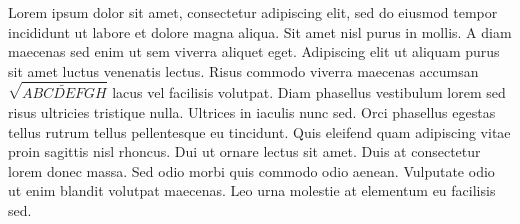 Lorem ipsum dolor sit amet, consectetur adipiscing elit, sed do eiusmod tempor
incididunt ut labore et dolore magna aliqua. Sit amet nisl purus in mollis. A
diam maecenas sed enim ut sem viverra aliquet eget. Adipiscing elit ut aliquam
purus sit amet luctus venenatis lectus. Risus commodo viverra maecenas accumsan
$\sqrt{\widetilde{ABCDEFGH}}$ lacus vel facilisis volutpat. Diam phasellus vestibulum lorem sed risus
ultricies tristique nulla. Ultrices in iaculis nunc sed. Orci phasellus egestas
tellus rutrum tellus pellentesque eu tincidunt. Quis eleifend quam adipiscing
vitae proin sagittis nisl rhoncus. Dui ut ornare lectus sit amet. Duis at
consectetur lorem donec massa. Sed odio morbi quis commodo odio aenean.
Vulputate odio ut enim blandit volutpat maecenas. Leo urna molestie at
elementum eu facilisis sed.


\the\abovecaptionskip\\
\the\belowcaptionskip\\
\the\textfloatsep\\
\the\footins

\the\textwidth

\the\skip\footins

\the\baselineskip

\the\abovedisplayskip

\the\belowdisplayskip
